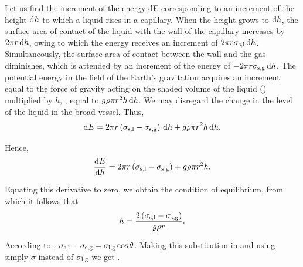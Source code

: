 Let us find the increment of the energy dE corresponding to an increment of the height $\mathrm{d} h$ to which a liquid rises in a capillary. When the height grows to $\mathrm{d} h$, the surface area of contact of the liquid with the wall of the capillary increases by $2\pi r\,\mathrm{d} h$, owing to which the energy receives an increment of $2\pi r\sigma_{\text{s,l}}\,\mathrm{d} h$. Simultaneously, the surface area of contact between the wall and the gas diminishes, which is attended by an increment of the energy of $-2\pi r\sigma_{\text{s,g}}\,\mathrm{d} h$. The potential energy in the field of the Earth's gravitation acquires an increment equal to the force of gravity acting on the shaded volume of the liquid () multiplied by $h$, \ie, equal to $g\rho\pi r^2h\,\mathrm{d} h$. We may disregard the change in the level of the liquid in the broad vessel. Thus,
\begin{equation*}
	\mathrm{d} E = 2\pi r\left(\sigma_{\text{s,l}} - \sigma_{\text{s,g}}\right)\,\mathrm{d} h + g\rho\pi r^2h\,\mathrm{d} h.
\end{equation*}

\noindent
Hence,
\begin{equation*}
	\frac{\mathrm{d} E}{\mathrm{d} h} = 2\pi r\left(\sigma_{\text{s,l}} - \sigma_{\text{s,g}}\right) + g\rho\pi r^2h.
\end{equation*}

\noindent
Equating this derivative to zero, we obtain the condition of equilibrium, from which it follows that
\begin{equation}\label{eq:14_10}
	h = \frac{2\left(\sigma_{\text{s,l}} - \sigma_{\text{s,g}}\right)}{g\rho r}.
\end{equation}

\noindent
According to , $\sigma_{\text{s,l}} - \sigma_{\text{s,g}} = \sigma_{\text{l,g}}\cos\theta$. Making this substitution in  and using simply $\sigma$ instead of $\sigma_{\text{l,g}}$ we get .

